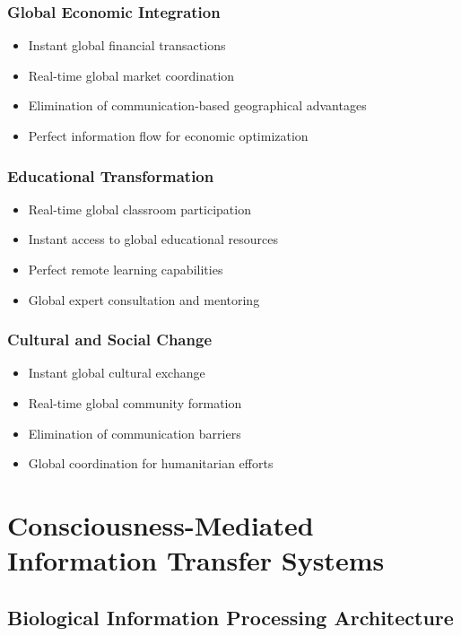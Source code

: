\documentclass[12pt,a4paper]{article}
\begin{document}
\subsubsection{Global Economic Integration}
\begin{itemize}
\item Instant global financial transactions
\item Real-time global market coordination
\item Elimination of communication-based geographical advantages
\item Perfect information flow for economic optimization
\end{itemize}

\subsubsection{Educational Transformation}
\begin{itemize}
\item Real-time global classroom participation
\item Instant access to global educational resources
\item Perfect remote learning capabilities
\item Global expert consultation and mentoring
\end{itemize}

\subsubsection{Cultural and Social Change}
\begin{itemize}
\item Instant global cultural exchange
\item Real-time global community formation
\item Elimination of communication barriers
\item Global coordination for humanitarian efforts
\end{itemize}

\section{Consciousness-Mediated Information Transfer Systems}

\subsection{Biological Information Processing Architecture}
\end{document}
